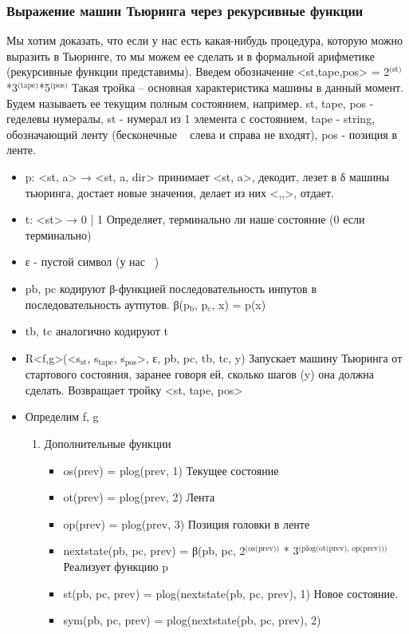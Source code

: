 \documentclass[11pt]{article}
\begin{document}
\subsubsection{Выражение машин Тьюринга через рекурсивные функции}
\label{sec-12-5-1}
Мы хотим доказать, что если у нас есть какая-нибудь процедура, которую
можно выразить в Тьюринге, то мы можем ее сделать и в формальной арифметике
(рекурсивные функции представимы).
Введем обозначение <st,tape,pos> = 2$^{\text{(st)}}$*3$^{\text{(tape)}}$*5$^{\text{(pos)}}$
Такая тройка -- основная характеристика машины в данный момент.
Будем называеть ее текущим полным состоянием, например.
st, tape, pos - геделевы нумералы, st - нумерал из 1 элемента с состоянием,
tape - string, обозначающий ленту (бесконечные   слева и справа не входят),
pos - позиция в ленте.
\begin{itemize}
\item p: <st, a> → <st, a, dir>
принимает <st, a>, декодит, лезет в δ машины тьюринга, достает
новые значения, делает из них <,,>, отдает.
\item t: <st> → 0 | 1
Определяет, терминально ли наше состояние (0 если терминально)
\item ε - пустой символ (у нас  )
\item pb, pc кодируют β-функцией последовательность инпутов
в последовательность аутпутов. β(p$_{\text{b}}$, p$_{\text{c}}$, x) = p(x)
\item tb, tc аналогично кодируют t
\item R<f,g>(<s$_{\text{st}}$, s$_{\text{tape}}$, s$_{\text{pos}}$>, ε, pb, pc, tb, tc, y)
Запускает машину Тьюринга от стартового состояния, заранее
говоря ей, сколько шагов (y) она должна сделать.
Возвращает тройку <st, tape, pos>
\item Определим f, g
\begin{enumerate}
\item Дополнительные функции
\begin{itemize}
\item os(prev) = plog(prev, 1)
Текущее состояние
\item ot(prev) = plog(prev, 2)
Лента
\item op(prev) = plog(prev, 3)
Позиция головки в ленте
\item nextstate(pb, pc, prev) = β(pb, pc, 2$^{\text{(os(prev))}}$ * 3$^{\text{(plog(ot(prev), op(prev)))}}$
           Реализует функцию p
\item st(pb, pc, prev) = plog(nextstate(pb, pc, prev), 1)
Новое состояние.
\item sym(pb, pc, prev) = plog(nextstate(pb, pc, prev), 2)

\end{itemize}
\end{enumerate}
\end{itemize}
\end{document}
